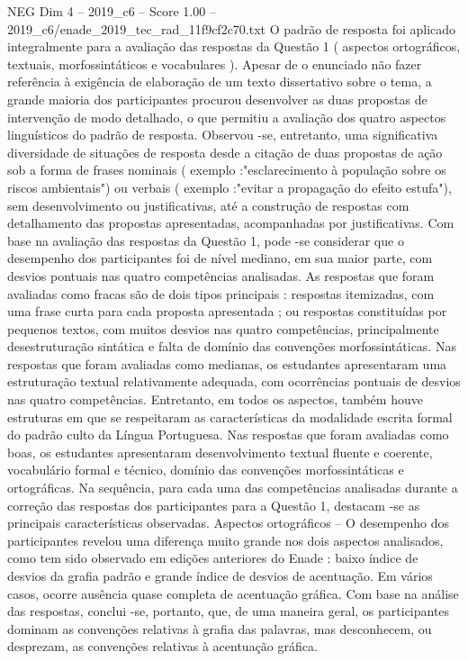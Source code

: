 \begin{textsample}{NEG Dim 4 – 2019\_c6 – Score 1.00 – 2019\_c6/enade\_2019\_tec\_rad\_11f9cf2c70.txt}
O padrão de resposta foi aplicado integralmente para a avaliação das respostas da Questão 1 ( aspectos ortográficos, textuais, morfossintáticos e vocabulares ).
Apesar de o enunciado não fazer referência à exigência de elaboração de um texto dissertativo sobre o tema, a grande maioria dos participantes procurou desenvolver as duas propostas de intervenção de modo detalhado, o que permitiu a avaliação dos quatro aspectos linguísticos do padrão de resposta.
Observou -se, entretanto, uma significativa diversidade de situações de resposta desde a citação de duas propostas de ação sob a forma de frases nominais ( exemplo :"esclarecimento à população sobre os riscos ambientais") ou verbais ( exemplo :"evitar a propagação do efeito estufa"), sem desenvolvimento ou justificativas, até a construção de respostas com detalhamento das propostas apresentadas, acompanhadas por justificativas.
Com base na avaliação das respostas da Questão 1, pode -se considerar que o desempenho dos participantes foi de nível mediano, em sua maior parte, com desvios pontuais nas quatro competências analisadas.
As respostas que foram avaliadas como fracas são de dois tipos principais : respostas itemizadas, com uma frase curta para cada proposta apresentada ; ou respostas constituídas por pequenos textos, com muitos desvios nas quatro competências, principalmente desestruturação sintática e falta de domínio das convenções morfossintáticas.
Nas respostas que foram avaliadas como medianas, os estudantes apresentaram uma estruturação textual relativamente adequada, com ocorrências pontuais de desvios nas quatro competências.
Entretanto, em todos os aspectos, também houve estruturas em que se respeitaram as características da modalidade escrita formal do padrão culto da Língua Portuguesa.
Nas respostas que foram avaliadas como boas, os estudantes apresentaram desenvolvimento textual fluente e coerente, vocabulário formal e técnico, domínio das convenções morfossintáticas e ortográficas.
Na sequência, para cada uma das competências analisadas durante a correção das respostas dos participantes para a Questão 1, destacam -se as principais características observadas.
Aspectos ortográficos – O desempenho dos participantes revelou uma diferença muito grande nos dois aspectos analisados, como tem sido observado em edições anteriores do Enade : baixo índice de desvios da grafia padrão e grande índice de desvios de acentuação.
Em vários casos, ocorre ausência quase completa de acentuação gráfica.
Com base na análise das respostas, conclui -se, portanto, que, de uma maneira geral, os participantes dominam as convenções relativas à grafia das palavras, mas desconhecem, ou desprezam, as convenções relativas à acentuação gráfica.

\end{textsample}
